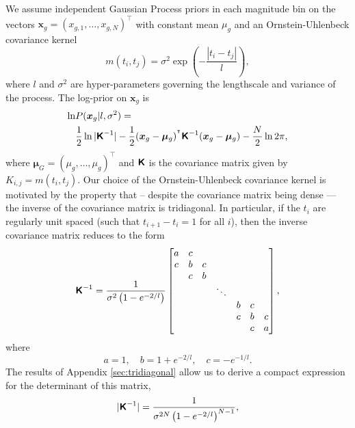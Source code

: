 \documentclass[fleqn,usenatbib]{mnras}
\begin{document}
We assume independent Gaussian Process priors in each magnitude bin on the vectors $\bm{x}_g=(x_{g,1},\dots,x_{g,N})^\intercal$ with constant mean $\mu_g$ and an Ornstein-Uhlenbeck covariance kernel 
\begin{equation}
    m(t_i,t_j) = \sigma^2 \exp\left({-\frac{|t_i-t_j|}{l}}\right),
\end{equation}
where $l$ and $\sigma^2$ are hyper-parameters governing the lengthscale and variance of the process. The log-prior on $\bm{x}_g$ is
\begin{align}
    \ln&{P(\bm{x}_g|l,\sigma^2)}= \nonumber \\ &\frac{1}{2}\ln|\textbf{\textsf{K}}^{-1}|-\frac{1}{2}(\bm{x}_g-\boldsymbol{\mu}_g)^{^\intercal}\textbf{\textsf{K}}^{-1}(\bm{x}_g-\boldsymbol{\mu}_g) -\frac{N}{2}\ln2\pi, \label{eq:priorx}
\end{align}
where $\boldsymbol{\mu}_G=(\mu_g,\dots,\mu_g)^\intercal$ and $\textbf{\textsf{K}}$ is the covariance matrix given by $K_{i,j}=m(t_i,t_j)$. Our choice of the Ornstein-Uhlenbeck covariance kernel is motivated by the property that -- despite the covariance matrix being dense --- the inverse of the covariance matrix is tridiagonal. In particular, if the $t_i$ are regularly unit spaced (such that $t_{i+1}-t_i = 1$ for all $i$), then the inverse covariance matrix reduces to the form
\begin{equation}
    \textbf{\textsf{K}}^{-1} = \frac{1}{\sigma^2\left(1-e^{-2/l}\right)}
    \begin{bmatrix} 
    a & c &   &        &   &   &   \\
    c & b & c &        &   &   &   \\
      & c & b &        &   &   &   \\
      &   &   & \ddots &   &   &   \\
      &   &   &        & b & c &   \\
      &   &   &        & c & b & c \\
      &   &   &        &   & c & a 
    \end{bmatrix}, \label{eq:tridiagonal}
\end{equation}
where
\begin{equation}
    a = 1,\quad b=1+e^{-2/l},\quad c =-e^{-1/l}.
\end{equation}
The results of Appendix \ref{sec:tridiagonal} allow us to derive a compact expression for the determinant of this matrix,
\begin{equation}
    |\textbf{\textsf{K}}^{-1}| = \frac{1}{\sigma^{2N}\left(1-e^{-2/l}\right)^{N-1}},
\end{equation}
\end{document}
